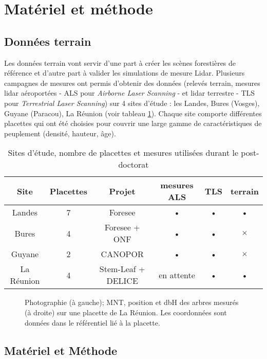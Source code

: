 \documentclass[a4paper,11pt]{article}
\begin{document}
\section{Matériel et méthode}

\subsection{Données terrain}
Les données terrain  vont servir d'une part à créer les scènes forestières de référence et d'autre part à valider les simulations de mesure Lidar. Plusieurs campagnes de mesures ont permis d'obtenir des données (relevés terrain, mesures lidar aéroportées - ALS pour \textit{Airborne Laser Scanning} - et lidar terrestre - TLS pour \textit{Terrestrial Laser Scanning})  sur 4 sites d'étude : les Landes, Bures (Vosges), Guyane (Paracou), La Réunion (voir tableau \ref{tab:sites}). Chaque site comporte différentes placettes qui ont été choisies pour couvrir une large gamme de caractéristiques de peuplement (densité, hauteur, âge).  

\begin{table}[htpb!]
\caption {Sites d'étude, nombre de placettes et mesures utilisées durant le post-doctorat}
\label{tab:sites}
\centering
\begin{tabular}{c|c|c|c|c|c}
Site & Placettes & Projet & mesures ALS & TLS & terrain\\ 
\hline 
Landes & 7 & Foresee & • & • & •\\ 
Bures & 4 & Foresee + ONF & • & • & $\times$\\ 
Guyane & 2 & CANOPOR & • & • & $\times$\\ 
La Réunion & 4 & Stem-Leaf + DELICE & en attente & • & • \\ 
\end{tabular} 
\end{table} 


\begin{figure}[!htpb]
\centering
{}
\caption{Photographie (à gauche); MNT, position et dbH des arbres mesurés (à droite) sur une placette de La Réunion. Les coordonnées sont données dans le référentiel lié à la placette. }
\label{fig:relevesReunion}
\end{figure}

\subsection{ Matériel et Méthode}
\end{document}
